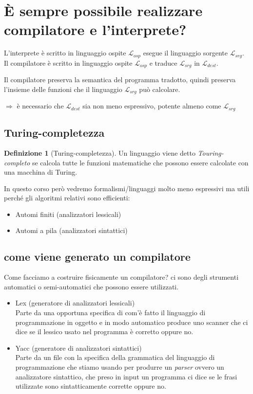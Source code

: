 \documentclass[a4paper,11pt,hidelinks]{book}
\theoremstyle{definition}
\newtheorem*{definizione}{Definizione}
\begin{document}
    \section{È sempre possibile realizzare compilatore e l'interprete?}
    L'interprete è scritto in linguaggio ospite $\mathcal{L}_{osp}$ esegue il linguaggio sorgente $\mathcal{L}_{srg}$. \\
    Il compilatore è scritto in linguaggio ospite $\mathcal{L}_{osp}$ e traduce $\mathcal{L}_{srg}$ in $\mathcal{L}_{dest}$.
    
    Il compilatore preserva la semantica del programma tradotto, quindi preserva l'insieme delle funzioni che il linguaggio $\mathcal{L}_{srg}$ può calcolare.
    
    $\Rightarrow$ è necessario che $\mathcal{L}_{dest}$ sia non meno espressivo, potente almeno come $\mathcal{L}_{srg}$ 
    
    \subsection{Turing-completezza}
    \begin{definizione}[Turing-completezza]
        Un linguaggio viene detto \textit{Touring-completo} se calcola tutte le funzioni matematiche che possono essere calcolate con una macchina di Turing.
    \end{definizione}
    In questo corso però vedremo formalismi/linguaggi molto meno espressivi ma utili perché gli algoritmi relativi sono efficienti:
    \begin{multicols}{2}
    \begin{itemize}
        \item Automi finiti (analizzatori lessicali)
        \item Automi a pila (analizzatori sintattici)
    \end{itemize}
    \end{multicols}
    
    \subsection{come viene generato un compilatore}
    Come facciamo a costruire fisicamente un compilatore? ci sono degli strumenti automatici o semi-automatici che possono essere utilizzati.
    \begin{itemize}
        \item Lex (generatore di analizzatori lessicali) \\
        Parte da una opportuna specifica di com'è fatto il linguaggio di programmazione in oggetto e in modo automatico produce uno scanner che ci dice se il lessico usato nel programma è corretto oppure no.
        \item Yacc (generatore di analizzatori sintattici) \\
        Parte da un file con la specifica della grammatica del linguaggio di programmazione che stiamo usando per produrre un \textit{parser} ovvero un analizzatore sintattico, che preso in input un programma ci dice se le frasi utilizzate sono sintatticamente corrette oppure no.
    \end{itemize}
    
\end{document}
